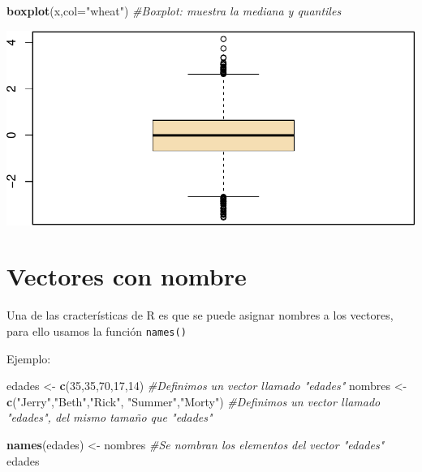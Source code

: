 \documentclass[
]{book}
\newenvironment{Shaded}{\begin{snugshade}}{\end{snugshade}}
\newcommand{\AttributeTok}[1]{\textcolor[rgb]{0.13,0.29,0.53}{#1}}
\newcommand{\CommentTok}[1]{\textcolor[rgb]{0.56,0.35,0.01}{\textit{#1}}}
\newcommand{\DecValTok}[1]{\textcolor[rgb]{0.00,0.00,0.81}{#1}}
\newcommand{\FunctionTok}[1]{\textcolor[rgb]{0.13,0.29,0.53}{\textbf{#1}}}
\newcommand{\NormalTok}[1]{#1}
\newcommand{\OtherTok}[1]{\textcolor[rgb]{0.56,0.35,0.01}{#1}}
\newcommand{\StringTok}[1]{\textcolor[rgb]{0.31,0.60,0.02}{#1}}
\begin{document}
\begin{Shaded}
\begin{Highlighting}[]
\FunctionTok{boxplot}\NormalTok{(x,}\AttributeTok{col=}\StringTok{"wheat"}\NormalTok{) }\CommentTok{\#Boxplot: muestra la mediana y quantiles}
\end{Highlighting}
\end{Shaded}

\includegraphics{bookdown-demo_files/figure-latex/unnamed-chunk-76-3.pdf}

\hypertarget{vectores-con-nombre}{%
\section{Vectores con nombre}\label{vectores-con-nombre}}

Una de las cracterísticas de R es que se puede asignar nombres a los vectores, para ello usamos la función \texttt{names()}

Ejemplo:

\begin{Shaded}
\begin{Highlighting}[]
\NormalTok{edades }\OtherTok{\textless{}{-}} \FunctionTok{c}\NormalTok{(}\DecValTok{35}\NormalTok{,}\DecValTok{35}\NormalTok{,}\DecValTok{70}\NormalTok{,}\DecValTok{17}\NormalTok{,}\DecValTok{14}\NormalTok{) }\CommentTok{\#Definimos un vector llamado "edades"}
\NormalTok{nombres }\OtherTok{\textless{}{-}} \FunctionTok{c}\NormalTok{(}\StringTok{"Jerry"}\NormalTok{,}\StringTok{"Beth"}\NormalTok{,}\StringTok{"Rick"}\NormalTok{, }\StringTok{"Summer"}\NormalTok{,}\StringTok{"Morty"}\NormalTok{) }\CommentTok{\#Definimos un vector llamado "edades", del mismo tamaño que "edades"}

\FunctionTok{names}\NormalTok{(edades) }\OtherTok{\textless{}{-}}\NormalTok{ nombres }\CommentTok{\#Se nombran los elementos del vector "edades"}
\NormalTok{edades}
\end{Highlighting}
\end{Shaded}
\end{document}
